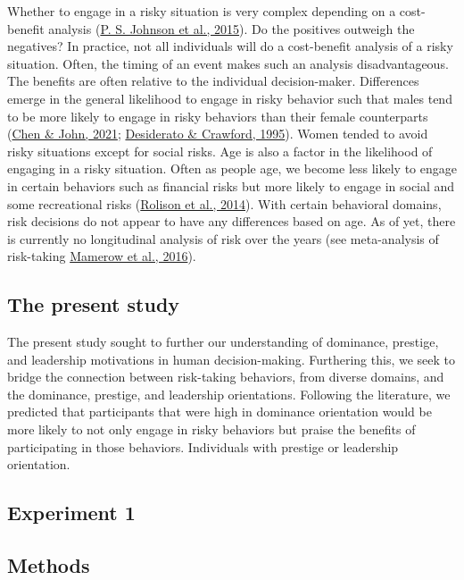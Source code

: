 \documentclass[
  donotrepeattitle,doc, 12pt, a4paper,floatsintext]{apa7}
\begin{document}
Whether to engage in a risky situation is very complex depending on a cost-benefit analysis (\protect\hyperlink{ref-johnson2015a}{P. S. Johnson et al., 2015}). Do the positives outweigh the negatives? In practice, not all individuals will do a cost-benefit analysis of a risky situation. Often, the timing of an event makes such an analysis disadvantageous. The benefits are often relative to the individual decision-maker. Differences emerge in the general likelihood to engage in risky behavior such that males tend to be more likely to engage in risky behaviors than their female counterparts (\protect\hyperlink{ref-chen2021}{Chen \& John, 2021}; \protect\hyperlink{ref-desiderato1995}{Desiderato \& Crawford, 1995}). Women tended to avoid risky situations except for social risks. Age is also a factor in the likelihood of engaging in a risky situation. Often as people age, we become less likely to engage in certain behaviors such as financial risks but more likely to engage in social and some recreational risks (\protect\hyperlink{ref-rolison2014}{Rolison et al., 2014}). With certain behavioral domains, risk decisions do not appear to have any differences based on age. As of yet, there is currently no longitudinal analysis of risk over the years (see meta-analysis of risk-taking \protect\hyperlink{ref-mamerow2016}{Mamerow et al., 2016}).

\hypertarget{the-present-study}{%
\subsection{The present study}\label{the-present-study}}

The present study sought to further our understanding of dominance, prestige, and leadership motivations in human decision-making. Furthering this, we seek to bridge the connection between risk-taking behaviors, from diverse domains, and the dominance, prestige, and leadership orientations. Following the literature, we predicted that participants that were high in dominance orientation would be more likely to not only engage in risky behaviors but praise the benefits of participating in those behaviors. Individuals with prestige or leadership orientation.

\hypertarget{experiment-1}{%
\subsection{Experiment 1}\label{experiment-1}}

\hypertarget{methods}{%
\subsection{Methods}\label{methods}}
\end{document}
